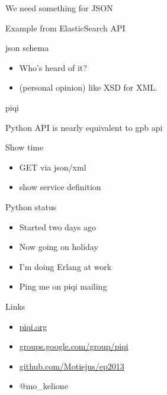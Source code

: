 \documentclass[14pt]{beamer}
\newcommand{\listing}[1]{
    {\tiny }
}
\begin{document}
\begin{frame}{We need something for JSON}
    \listing{example.json}
    {\small Example from ElasticSearch API}
\end{frame}

\begin{frame}{json schema}
    \begin{itemize}
        \item Who's heard of it?
        \item (personal opinion) like XSD for XML.
    \end{itemize}
\end{frame}

\begin{frame}{piqi}
    \listing{../demo/priv/person.piqi}
\end{frame}

\begin{frame}{Python API is nearly equivalent to gpb api}
    \listing{pysession.txt}
\end{frame}

\begin{frame}{Show time}
    \begin{itemize}
        \item GET via json/xml
            \pause
        \item show service definition
    \end{itemize}
\end{frame}

\begin{frame}{Python status}
    \begin{itemize}
        \item Started two days ago
        \item Now going on holiday
            \pause
        \item I'm doing Erlang at work
        \item Ping me on piqi mailing
    \end{itemize}
\end{frame}

\begin{frame}{Links}
    \begin{itemize}
        \item \url{piqi.org}
        \item \url{groups.google.com/group/piqi}
        \item \url{github.com/Motiejus/ep2013}
        \item @mo\_kelione
    \end{itemize}
\end{frame}
\end{document}
